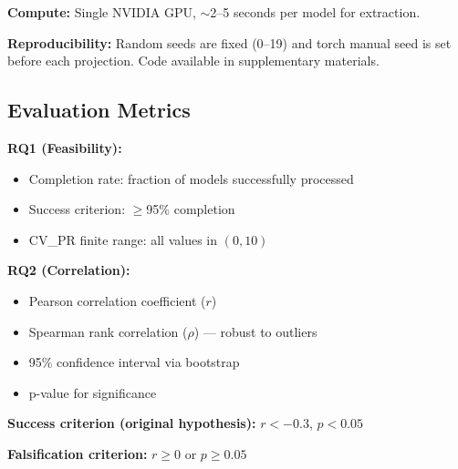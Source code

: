 \textbf{Compute:} Single NVIDIA GPU, $\sim$2--5 seconds per model for extraction.

\textbf{Reproducibility:} Random seeds are fixed (0--19) and torch manual seed is set before each projection. Code available in supplementary materials.

\subsection{Evaluation Metrics}

\textbf{RQ1 (Feasibility):}
\begin{itemize}
    \item Completion rate: fraction of models successfully processed
    \item Success criterion: $\geq$95\% completion
    \item CV\_PR finite range: all values in $(0, 10)$
\end{itemize}

\textbf{RQ2 (Correlation):}
\begin{itemize}
    \item Pearson correlation coefficient ($r$)
    \item Spearman rank correlation ($\rho$) --- robust to outliers
    \item 95\% confidence interval via bootstrap
    \item p-value for significance
\end{itemize}

\textbf{Success criterion (original hypothesis):} $r < -0.3$, $p < 0.05$

\textbf{Falsification criterion:} $r \geq 0$ or $p \geq 0.05$
